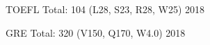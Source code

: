 

\begin{cvhonors}
  \cvhonor
    {TOEFL} %
    {Total: 104 (L28, S23, R28, W25)} %
    {} %
    {2018} %

  \cvhonor
    {GRE} %
    {Total: 320 (V150, Q170, W4.0)} %
    {} %
    {2018} %



\end{cvhonors}
